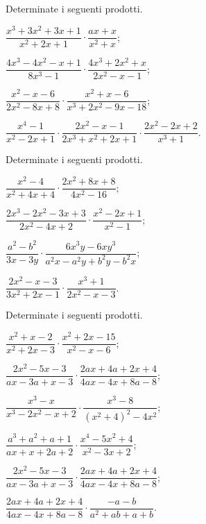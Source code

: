 \begin{esercizio}[\Ast]
\label{ese:14.14}
Determinate i seguenti prodotti.
\begin{enumeratea}
 \item $\dfrac{x^{3}+3x^{2}+3x+1}{x^{2}+2x+1}\cdot \dfrac{ax+x}{x^{2}+x}$;
 \item $\dfrac{4x^{3}-4x^{2}-x+1}{8x^{3}-1}\cdot\dfrac{4x^{3}+2x^{2}+x}{2x^{2}-x-1}$;
 \item $\dfrac{x^{2}-x-6}{2x^{2}-8x+8}\cdot\dfrac{x^{2}+x-6}{x^{3}+2x^{2}-9x-18}$;
 \item $\dfrac{x^{4}-1}{x^{2}-2x+1}\cdot\dfrac{2x^{2}-x-1}{2x^{3}+x^{2}+2x+1}\cdot\dfrac{2x^{2}-2x+2}{x^{3}+1}$.
\end{enumeratea}
\end{esercizio}

\begin{esercizio}
\label{ese:14.15}
Determinate i seguenti prodotti.
\begin{multicols}{2}
\begin{enumeratea}
 \item $\dfrac{x^{2}-4}{x^{2}+4x+4}\cdot \dfrac{2x^{2}+8x+8}{4x^{2}-16}$;
 \item $\dfrac{2x^{3}-2x^{2}-3x+3}{2x^{2}-4x+2}\cdot{\dfrac{x^{2}-2x+1}{x^{2}-1}}$;
 \item $\dfrac{a^{2}-b^{2}}{3x-3y}\cdot {\dfrac{6x^{3}y-6xy^{3}}{a^{2}x-a^{2}y+b^{2}y-b^{2}x}}$;
 \item $\dfrac{2x^{2}-x-3}{3x^{2}+2x-1}\cdot {\dfrac{x^{3}+1}{2x^{2}-x-3}}$.
\end{enumeratea}
\end{multicols}
\end{esercizio}

\begin{esercizio}[\Ast]
\label{ese:14.16}
Determinate i seguenti prodotti.
\begin{multicols}{2}
\begin{enumeratea}
 \item $\dfrac{x^{2}+x-2}{x^{2}+2x-3}\cdot {\dfrac{x^{2}+2x-15}{x^{2}-x-6}}$;
 \item $\dfrac{2x^{2}-5x-3}{ax-3a+x-3}\cdot {\dfrac{2ax+4a+2x+4}{4ax-4x+8a-8}}$;
 \item $\dfrac{x^{3}-x}{x^{3}-2x^{2}-x+2}\cdot {\dfrac{x^{3}-8}{\left(x^{2}+4\right)^{2}-4x^{2}}}$;
 \item $\dfrac{a^{3}+a^{2}+a+1}{ax+x+2a+2}\cdot {\dfrac{x^{4}-5x^{2}+4}{x^{2}-3x+2}}$;
 \item $\dfrac{2x^{2}-5x-3}{ax-3a+x-3}\cdot {\dfrac{2ax+4a+2x+4}{4ax-4x+8a-8}}$;
 \item $\dfrac{2ax+4a+2x+4}{4ax-4x+8a-8}\cdot {\dfrac{-a-b}{a^{2}+ab+a+b}}$.
\end{enumeratea}
\end{multicols}
\end{esercizio}

